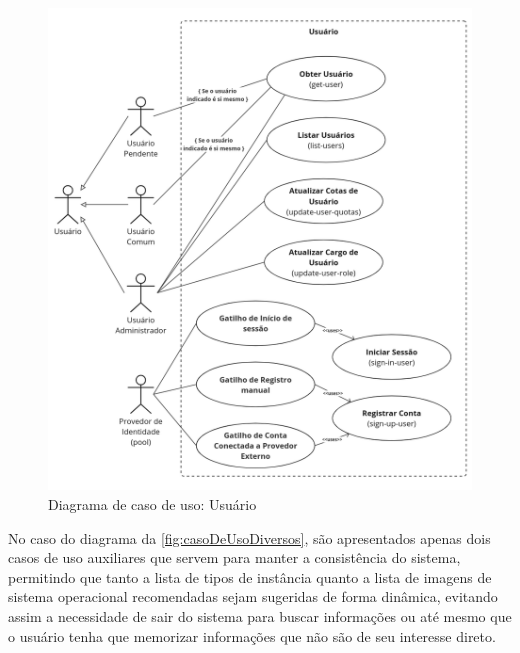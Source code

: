 \begin{figure}[H]
\caption{Diagrama de caso de uso: Usuário}
\label{fig:casoDeUsoUsuario}
\includegraphics[width=\textwidth]{capitulos/2-metodologia/files/use-case-user.png}
\end{figure}

No caso do diagrama da \autoref{fig:casoDeUsoDiversos}, são apresentados apenas dois casos de uso auxiliares que servem para manter a consistência do sistema, permitindo que tanto a lista de tipos de instância quanto a lista de imagens de sistema operacional recomendadas sejam sugeridas de forma dinâmica, evitando assim a necessidade de sair do sistema para buscar informações ou até mesmo que o usuário tenha que memorizar informações que não são de seu interesse direto.

